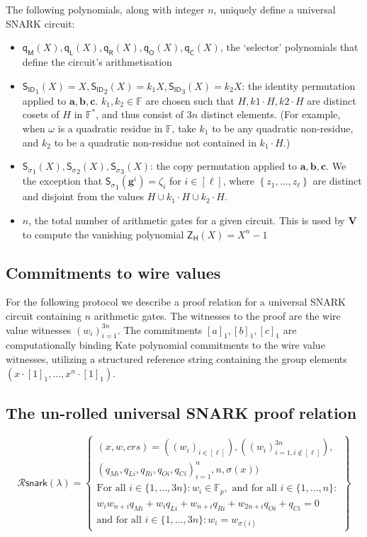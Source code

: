 \documentclass[11pt]{article} %
\newcommand{\F}{\ensuremath{\mathbb F}\xspace}
\newcommand{\ver}{\ensuremath{\mathsf{\mathbf{V}}}\xspace}
\newcommand{\set}[1]{\ensuremath{\left\{#1\right\}}\xspace}
\newcommand{\hgen}{\ensuremath{\mathbf{g}}\xspace}
\newcommand{\sigpoly}{\ensuremath{\mathsf{S_{\sigma}}}\xspace}
\newcommand{\idpoly}{\ensuremath{\mathsf{S_{ID}}}\xspace}
\newcommand{\lvar}{\ensuremath{\mathbf{a}}\xspace}
\newcommand{\rvar}{\ensuremath{\mathbf{b}}\xspace}
\newcommand{\ovar}{\ensuremath{\mathbf{c}}\xspace}
\newcommand{\ZeroH}{\ensuremath{Z_{H}} \xspace}
\newcommand{\zeropoly}{\ensuremath{\mathsf{\ZeroH}}\xspace}
\newcommand{\selmultpoly}{\ensuremath{\mathsf{q_M}}\xspace}
\newcommand{\selleftpoly}{\ensuremath{\mathsf{q_L}}\xspace}
\newcommand{\selrightpoly}{\ensuremath{\mathsf{q_R}}\xspace}
\newcommand{\seloutpoly}{\ensuremath{\mathsf{q_O}}\xspace}
\newcommand{\selconstpoly}{\ensuremath{\mathsf{q_C}}\xspace}
\newcommand{\R}{\mathcal{R}}
\newcommand{\snark}{\ensuremath{\mathsf{snark(\lambda)}}\xspace}
\newcommand{\Verify}{\mathcal{V}}
\newcommand{\Vsnark}{\ver}%
\newcommand{\Rsnark}{\R{\snark}}
\begin{document}
The following polynomials, along with integer $n$, uniquely define a universal SNARK circuit:

\begin{itemize}
	\item $\selmultpoly(X), \selleftpoly(X), \selrightpoly(X), \seloutpoly(X), \selconstpoly(X)$, the `selector' polynomials that define the circuit's arithmetisation
	\item $\idpoly_1(X) = X, \idpoly_2(X) = k_1X, \idpoly_3(X) = k_2X$: the identity permutation applied to $\lvar, \rvar, \ovar$. $k_1, k_2\in \F$ are chosen such that $H,k1\cdot H,k2\cdot H$ are distinct cosets of $H$ in $\F^*$, and thus consist of $3n$ distinct elements. (For example, when $\omega$ is a quadratic residue in $\F$, take $k_1$ to be any quadratic non-residue, and $k_2$ to be a  quadratic non-residue not contained in $k_1\cdot H$.)
	\item $\sigpoly_1(X), \sigpoly_2(X), \sigpoly_3(X)$: the copy permutation applied to $\lvar, \rvar, \ovar$.
	We the exception that $\sigpoly_1(\hgen^i) = \zeta_i$ for $i\in [\ell]$, where \set{z_1,\ldots,z_\ell} are distinct and disjoint from the values $H\cup k_1\cdot H\cup k_2\cdot H$.
	\item $n$, the total number of arithmetic gates for a given circuit. This is used by $\Vsnark$ to compute the vanishing polynomial $\zeropoly(X) = {X^{n} - 1}$
\end{itemize}

\subsection{Commitments to wire values}

For the following protocol we describe a proof relation for a universal SNARK circuit containing $n$ arithmetic gates. The witnesses to the proof are the wire value witnesses $(w_i)_{i=1}^{3n}$. The commitments $[a]_1, [b]_1, [c]_1$ are computationally binding Kate polynomial commitments to the wire value witnesses, utilizing a structured reference string containing the group elements $(x \cdot [1]_1, \ldots , x^{n} \cdot [1]_1)$. 

\subsection{The un-rolled universal SNARK proof relation}


$$\Rsnark=\left\{\begin{array}{c} (x,w,crs)=((w_i)_{i \in [\ell]}), ((w_i)_{i=1, i \notin [\ell]}^{3n}), \\
(q_{Mi}, q_{Li}, q_{Ri}, q_{Oi}, q_{Ci})_{i=1}^n, n, \sigma(x)) \\
\text{For all } i\in \{1,\ldots,3n\}: w_i \in \F_p,  
\text{ and for all } i \in \{1, \ldots, n \}:\\ w_i w_{n+i} q_{Mi} + w_i q_{Li} + w_{n+i} q_{Ri}+ w_{2n+i} q_{Oi} + q_{Ci} = 0 \\
\text{and for all } i \in \{1, \ldots, 3n \}: w_i = w_{\sigma(i)}
\end{array} \right\}$$
\end{document}
